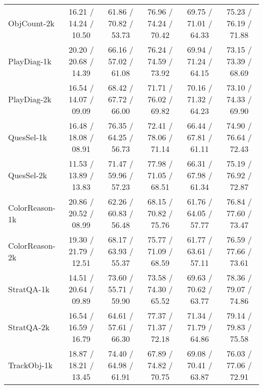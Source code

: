 \begin{table*}[h]
\begin{tabular}{lccccc}
ObjCount-2k
& 
16.21 / 14.24 / 10.50
& 61.86 / 70.82 / 53.73
& 76.96 / 74.24 / 70.42
& 
69.75 / 71.01 / 64.33
& 






75.23 / 76.19 / 71.88
\\
PlayDiag-1k
& 20.20 / 20.68 / 14.39
& 66.16 / 57.02 / 61.08
& 76.24 / 74.59 / 73.92
& 69.94 / 71.24 / 64.15
& 73.15 / 73.39 / 68.69
\\

PlayDiag-2k
& 
16.54 / 14.07 / 09.09
& 68.42 / 67.72 / 66.00
& 71.71 / 76.02 / 69.82
& 
70.16 / 71.32 / 64.23
& 





73.10 / 74.33 / 69.90
\\

QuesSel-1k
& 
16.48 / 18.08 / 08.91
& 76.35 / 64.25 / 56.73
& 72.41 / 78.06 / 71.14
& 66.44 / 67.81 / 61.11
& 
74.90 / 76.64 / 72.43
\\

QuesSel-2k
& 
11.53 / 13.89 / 13.83
& 71.47 / 59.96 / 57.23
& 77.98 / 71.05 / 68.51
& 
66.31 / 67.98 / 61.34
& 





75.19 / 76.92 / 72.87
\\
ColorReason-1k
& 20.86 / 20.52 / 08.99
& 62.26 / 60.83 / 56.48
& 68.15 / 70.82 / 75.76
& 61.76 / 64.05 / 57.77
& 76.84 / 77.60 / 73.47
\\

ColorReason-2k
& 
19.30 / 21.79 / 12.51
& 68.17 / 63.93 / 55.37
& 75.77 / 71.09 / 68.59
& 
61.77 / 63.61 / 57.11
& 




76.59 / 77.66 / 73.61
\\

StratQA-1k
& 
14.51 / 20.64 / 09.89
& 73.60 / 55.71 / 59.90
& 73.58 / 74.30 / 65.52
& 69.63 / 70.62 / 63.77
& 
78.36 / 79.07 / 74.86
\\

StratQA-2k
& 
16.54 / 16.59 / 16.79
& 64.61 / 57.61 / 66.30
& 77.37 / 71.37 / 72.18
& 
71.34 / 71.79 / 64.86
& 





79.14 / 79.83 / 75.58
\\
TrackObj-1k
& 18.87 / 18.21 / 13.45
& 74.40 / 64.98 / 61.91
& 67.89 / 74.82 / 70.75
& 69.08 / 70.41 / 63.87
& 76.03 / 77.06 / 72.91
\\


\end{tabular}
\end{table*}
